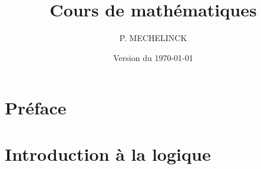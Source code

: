 \documentclass[oneside,openany,titlepage=false]{scrbook}
\title{Cours de mathématiques}
\author{P. MECHELINCK}
\date{Version du \today}
\begin{document}
\maketitle
{}
\tableofcontents

\newpage

\part*{Préface}



\part{Introduction à la logique}
\localtableofcontents


\newpage

\end{document}
